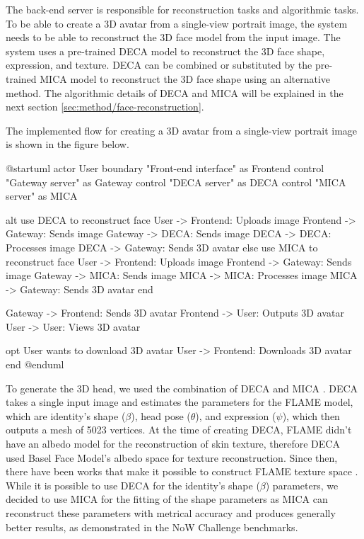 The back-end server is responsible for reconstruction tasks and algorithmic tasks. To be able to create a 3D avatar from a single-view portrait image, the system needs to be able to reconstruct the 3D face model from the input image. The system uses a pre-trained DECA model to reconstruct the 3D face shape, expression, and texture. DECA can be combined or substituted by the pre-trained MICA model \cite{zielonkaMetricalReconstructionHuman2022} to reconstruct the 3D face shape using an alternative method. The algorithmic details of DECA and MICA will be explained in the next section \ref{sec:method/face-reconstruction}.

The implemented flow for creating a 3D avatar from a single-view portrait image is shown in the figure below.

\begin{umlfigure}
    @startuml
    actor User
    boundary "Front-end interface" as Frontend
    control "Gateway server" as Gateway
    control "DECA server" as DECA
    control "MICA server" as MICA


    alt use DECA to reconstruct face
    User -> Frontend: Uploads image
    Frontend -> Gateway: Sends image
    Gateway -> DECA: Sends image
    DECA -> DECA: Processes image
    DECA -> Gateway: Sends 3D avatar
    else use MICA to reconstruct face
    User -> Frontend: Uploads image
    Frontend -> Gateway: Sends image
    Gateway -> MICA: Sends image
    MICA -> MICA: Processes image
    MICA -> Gateway: Sends 3D avatar
    end

    Gateway -> Frontend: Sends 3D avatar
    Frontend -> User: Outputs 3D avatar
    User -> User: Views 3D avatar

    opt User wants to download 3D avatar
    User -> Frontend: Downloads 3D avatar
    end
    @enduml
\end{umlfigure}

\clearpage

\label{sec:method/face-reconstruction}

To generate the 3D head, we used the combination of DECA \cite{fengLearningAnimatableDetailed2021} and MICA \cite{zielonkaMetricalReconstructionHuman2022}. DECA takes a single input image and estimates the parameters for the FLAME model, which are identity's shape ($\beta$), head pose ($\theta$), and expression ($\psi$), which then outputs a mesh of 5023 vertices. At the time of creating DECA, FLAME didn't have an albedo model for the reconstruction of skin texture, therefore DECA used Basel Face Model's albedo space for texture reconstruction. Since then, there have been works that make it possible to construct FLAME texture space \cite{fengPhotometricFLAMEFitting2023,smithMorphableFaceAlbedo2020}. While it is possible to use DECA for the identity's shape ($\beta$) parameters, we decided to use MICA for the fitting of the shape parameters as MICA can reconstruct these parameters with metrical accuracy and produces generally better results, as demonstrated in the NoW Challenge \cite{RingNet:CVPR:2019} benchmarks.


